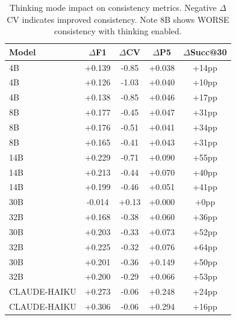 
\begin{table}[t]
\centering
\small
\caption{Thinking mode impact on consistency metrics. Negative $\Delta$CV indicates improved consistency. Note 8B shows WORSE consistency with thinking enabled.}
\label{tab:thinking_consistency}
\begin{tabular}{lcccc}
\toprule
\textbf{Model} & \textbf{$\Delta$F1} & \textbf{$\Delta$CV} & \textbf{$\Delta$P5} & \textbf{$\Delta$Succ@30} \\
\midrule
4B  & +0.139 & -0.85 & +0.038 & +14pp \\
4B  & +0.126 & -1.03 & +0.040 & +10pp \\
4B  & +0.138 & -0.85 & +0.046 & +17pp \\
8B  & +0.177 & -0.45 & +0.047 & +31pp \\
8B  & +0.176 & -0.51 & +0.041 & +34pp \\
8B  & +0.165 & -0.41 & +0.043 & +31pp \\
14B & +0.229 & -0.71 & +0.090 & +55pp \\
14B & +0.213 & -0.44 & +0.070 & +40pp \\
14B & +0.199 & -0.46 & +0.051 & +41pp \\
30B & -0.014 & +0.13 & +0.000 & +0pp \\
32B & +0.168 & -0.38 & +0.060 & +36pp \\
30B & +0.203 & -0.33 & +0.073 & +52pp \\
32B & +0.225 & -0.32 & +0.076 & +64pp \\
30B & +0.201 & -0.36 & +0.149 & +50pp \\
32B & +0.200 & -0.29 & +0.066 & +53pp \\
CLAUDE-HAIKU & +0.273 & -0.06 & +0.248 & +24pp \\
CLAUDE-HAIKU & +0.306 & -0.06 & +0.294 & +16pp \\
\bottomrule
\end{tabular}
\end{table}




